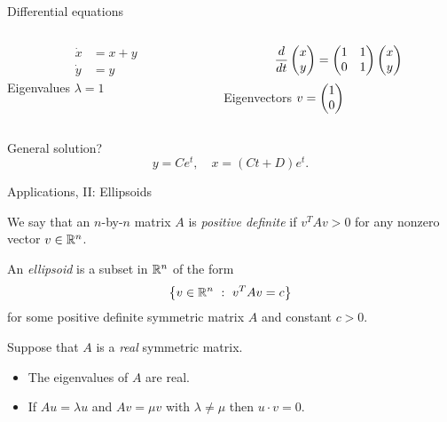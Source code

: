 \documentclass{beamer}
\begin{document}
\begin{frame}
{Differential equations}


\begin{columns}[t]
\begin{column}{0.4\textwidth}
\begin{align*}
\dot{x}&=x+y\\
\dot{y}&=y
\end{align*}
\vspace{0.5cm}
Eigenvalues \(\lambda=1\)
\end{column}
\begin{column}{0.45\textwidth}
\[\frac{d}{dt}\begin{pmatrix} x \\ y \end{pmatrix}=\begin{pmatrix} 1 & 1\\ 0 &
1\end{pmatrix}\begin{pmatrix} x \\ y \end{pmatrix}\]
Eigenvectors \(v=\begin{pmatrix} 1 \\ 0\end{pmatrix}\)
\end{column}
\end{columns}


 General solution?
\[y=Ce^t,\quad x=(Ct+D)e^t.\]


\end{frame}
\begin{frame}
\begin{center}
{\huge Applications, II: Ellipsoids}
\end{center}


\end{frame}
\begin{frame}
\begin{Definition}
We say that an \(n\)-by-\(n\) matrix \(A\) is {\em positive
definite} if \(v^TAv>0\) for any nonzero vector \(v\in\mathbb{R}^n\).


\end{Definition}
\begin{Definition}
An {\em ellipsoid} is a subset in \(\mathbb{R}^n\) of the form
\[\left\{v\in\mathbb{R}^n\ :\ v^TAv=c\right\}\] for some positive
definite symmetric matrix \(A\) and constant \(c>0\).


\end{Definition}
\end{frame}
\begin{frame}
\begin{Lemma}
Suppose that \(A\) is a {\em real} symmetric matrix.
\begin{itemize}
\item <2-> The eigenvalues of \(A\) are real.
\item <3-> If \(Au=\lambda u\) and \(Av=\mu v\) with
\(\lambda\neq\mu\) then \(u\cdot v=0\).


\end{itemize}
\end{Lemma}
\end{frame}
\end{document}
